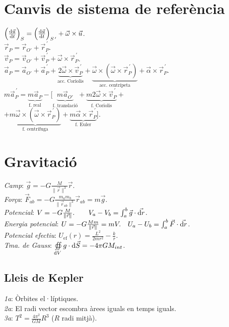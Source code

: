 \documentclass[10pt]{article}
\newcommand{\lp}{\left(}
\newcommand{\rp}{\right)}
\newcommand{\ci}{\textbullet\;}
\begin{document}
\begin{multicols}{4}
\section{Canvis de sistema de referència}
\ci $\lp \frac{\dif \vec{u}}{\dif t} \rp_S=\lp \frac{\dif \vec{u}}{\dif t} \rp_{S^{\, \prime}}+\vec{\omega}\times \vec{u}$. \\
\ci $\vec{r}_P = \vec{r}_{O'} + \vec{r}_{P}^{\, \prime}$. \\
\ci $\vec{v}_P = \vec{v}_{O'} + \vec{v}_{P}^{\, \prime} + \vec{\omega}\times\vec{r}_{P}^{\, \prime}$. \\
\ci $\vec{a}_P = \vec{a}_{O'} + \vec{a}_{P}^{\, \prime} + \underbrace{2\vec{\omega}\times\vec{v}_{P}^{\, \prime}}_{\text{acc. Coriolis}} + \underbrace{\vec{\omega}\times \lp \vec{\omega}\times \vec{r}_{P}^{\, \prime} \rp}_{\text{acc. centrípeta}} + \vec{\alpha}\times\vec{r}_{P}^{\, \prime}$. \\
\ci $m\vec{a}_{P}^{\, \prime} = \underbrace{m\vec{a}_P}_{\text{f. real}} - [ \underbrace{m\vec{a}_{O'}}_{\text{f. translació}} + \underbrace{m2\vec{\omega}\times\vec{v}_{P}^{\, \prime}}_{\text{f. Coriolis}} +$ \\
\qquad $+\underbrace{m\vec{\omega}\times \lp \vec{\omega}\times \vec{r}_{P}^{\, \prime} \rp}_{\text{f. centrífuga}} + \underbrace{m\vec{\alpha}\times\vec{r}_{P}^{\, \prime}}_{\text{f. Euler}} ]$.


\section{Gravitació}
\emph{Camp}: $\vec{g} = -G \frac{M}{\|\vec{r}\|^3} \vec{r}$. \\
\emph{Força}: $\vec{F}_{ab} = -G \frac{m_a m_b}{\|\vec{r}_{ab}\|^3} \vec{r}_{ab}=m\vec{g}$. \\
\emph{Potencial}: $V = -G \frac{M}{\|\vec{r}\|}. \qquad V_a-V_b = \int_a^b \vec{g} \cdot \vec{\dif r}$. \\
\emph{Energia potencial}: $U = -G \frac{Mm}{\|\vec{r}\|}=mV. \quad U_a-U_b = \int_a^b \vec{F} \cdot \vec{\dif r}$.\\
\emph{Potencial efectiu}: $U_\text{ef}(r) = \frac{L^2}{2mr^2} - \frac{k}{r}$.\\
\emph{Tma. de Gauss}: $\oiint\limits_{\dif V} g \cdot \dif{\vec{S}} = -4\pi GM_{int} $.

\subsection{Lleis de Kepler}
\emph{1a}: Òrbites el·líptiques. \\
\emph{2a}: El radi vector escombra àrees iguals en temps iguals. \\
\emph{3a}: $T^2=\frac{4\pi^2}{GM}R^3$ ($R$ radi mitjà).


\end{multicols}
\end{document}
